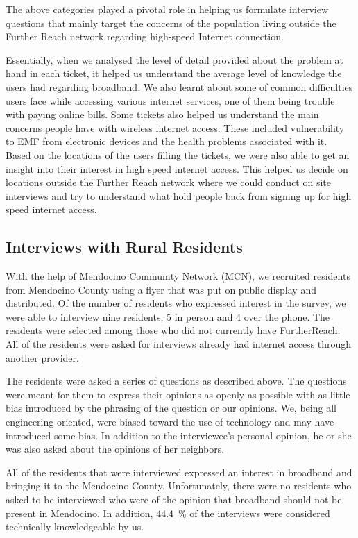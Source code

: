 The above categories played a pivotal role in helping us formulate interview questions that mainly target the concerns of the population living outside the Further Reach network regarding high-speed Internet connection.

Essentially, when we analysed the level of detail provided about the problem
at hand in each ticket, it helped us understand the average level of knowledge
the users had regarding broadband. We also learnt about some of common
difficulties users face while accessing various internet services, one of them
being trouble with paying online bills. Some tickets also helped us understand
the main concerns people have with wireless internet access. These included
vulnerability to EMF from electronic devices and the health problems
associated with it. Based on the locations of the users filling the tickets,
we were also able to get an insight into their interest in high speed internet
access. This helped us decide on locations outside the Further Reach network
where we could conduct on site interviews and try to understand what hold
people back from signing up for high speed internet access. 

\subsection{Interviews with Rural Residents}
\label{sec:interv-with-rural}

With the help of Mendocino Community Network (MCN), we recruited 
residents from Mendocino County using a flyer that was put on public display and distributed.
Of the number of residents who expressed interest in the survey, we were able to interview
nine residents, 5 in person and 4 over the phone. The residents were selected among those
who did not currently have FurtherReach. All of the residents were asked for interviews
already had internet access through another provider.

The residents were asked a series of questions as described above. The questions were meant for
them to express their opinions as openly as possible with as little bias introduced by the
phrasing of the question or our opinions. We, being all engineering-oriented,
were biased toward the use of technology and may have introduced some bias. In addition
to the interviewee's personal opinion, he or she was also asked about the opinions of her
neighbors.

All of the residents that were interviewed expressed an interest in broadband and bringing it
to the Mendocino County. Unfortunately, there were no residents who asked to be interviewed who 
were of the opinion that broadband should not be present in Mendocino. In addition, 44.4~\% of
the interviews were considered technically knowledgeable by us.

